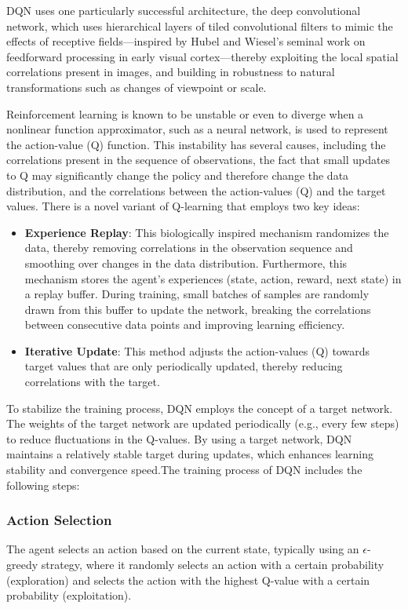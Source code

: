 \documentclass[journal]{IEEEtran}
\begin{document}
DQN uses one particularly successful architecture, the deep convolutional network, which uses hierarchical layers of tiled convolutional filters to mimic the effects of receptive fields—inspired by Hubel and Wiesel’s seminal work on feedforward processing in early visual cortex—thereby exploiting the local spatial correlations present in images, and building in robustness to natural transformations such as changes of viewpoint or scale.

Reinforcement learning is known to be unstable or even to diverge when a nonlinear function approximator, such as a neural network, is used to represent the action-value (Q) function. This instability has several causes, including the correlations present in the sequence of observations, the fact that small updates to Q may significantly change the policy and therefore change the data distribution, and the correlations between the action-values (Q) and the target values. There is a novel variant of Q-learning that employs two key ideas:

\begin{itemize}
\item \textbf{Experience Replay}: This biologically inspired mechanism randomizes the data, thereby removing correlations in the observation sequence and smoothing over changes in the data distribution. Furthermore, this mechanism stores the agent's experiences (state, action, reward, next state) in a replay buffer. During training, small batches of samples are randomly drawn from this buffer to update the network, breaking the correlations between consecutive data points and improving learning efficiency.
\item \textbf{Iterative Update}: This method adjusts the action-values (Q) towards target values that are only periodically updated, thereby reducing correlations with the target. 
\end{itemize}

To stabilize the training process, DQN employs the concept of a target network. The weights of the target network are updated periodically (e.g., every few steps) to reduce fluctuations in the Q-values. By using a target network, DQN maintains a relatively stable target during updates, which enhances learning stability and convergence speed.The training process of DQN includes the following steps:

\subsubsection{Action Selection}The agent selects an action based on the current state, typically using an $\epsilon$-greedy strategy, where it randomly selects an action with a certain probability (exploration) and selects the action with the highest Q-value with a certain probability (exploitation).
\end{document}
